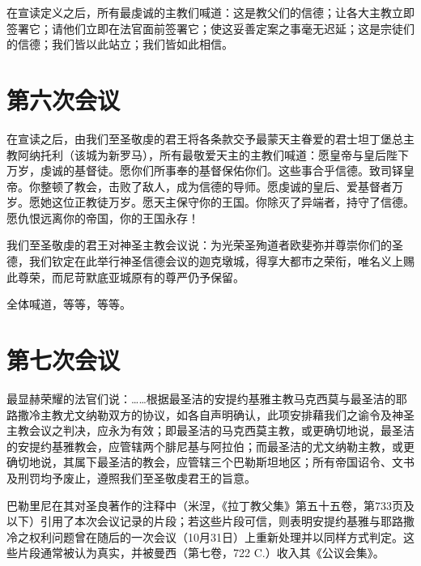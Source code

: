 在宣读定义之后，所有最虔诚的主教们喊道：这是教父们的信德；让各大主教立即签署它；请他们立即在法官面前签署它；使这妥善定案之事毫无迟延；这是宗徒们的信德；我们皆以此站立；我们皆如此相信。\par


\section{第六次会议}

\par

在宣读之后，由我们至圣敬虔的君王将各条款交予最蒙天主眷爱的君士坦丁堡总主教阿纳托利（该城为新罗马），所有最敬爱天主的主教们喊道：愿皇帝与皇后陛下万岁，虔诚的基督徒。愿你们所事奉的基督保佑你们。这些事合乎信德。致司铎皇帝。你整顿了教会，击败了敌人，成为信德的导师。愿虔诚的皇后、爱基督者万岁。愿她这位正教徒万岁。愿天主保守你的王国。你除灭了异端者，持守了信德。愿仇恨远离你的帝国，你的王国永存！\par

我们至圣敬虔的君王对神圣主教会议说：为光荣圣殉道者欧斐弥并尊崇你们的圣德，我们钦定在此举行神圣信德会议的迦克墩城，得享大都市之荣衔，唯名义上赐此尊荣，而尼苛默底亚城原有的尊严仍予保留。\par

全体喊道，等等，等等。\par

\par


\section{第七次会议}

最显赫荣耀的法官们说：……根据最圣洁的安提约基雅主教马克西莫与最圣洁的耶路撒冷主教尤文纳勒双方的协议，如各自声明确认，此项安排藉我们之谕令及神圣主教会议之判决，应永为有效；即最圣洁的马克西莫主教，或更确切地说，最圣洁的安提约基雅教会，应管辖两个腓尼基与阿拉伯；而最圣洁的尤文纳勒主教，或更确切地说，其属下最圣洁的教会，应管辖三个巴勒斯坦地区；所有帝国诏令、文书及刑罚均予废止，遵照我们至圣敬虔君王的旨意。\par

巴勒里尼在其对圣良著作的注释中（米涅，《拉丁教父集》第五十五卷，第733页及以下）引用了本次会议记录的片段；若这些片段可信，则表明安提约基雅与耶路撒冷之权利问题曾在随后的一次会议（10月31日）上重新处理并以同样方式判定。这些片段通常被认为真实，并被曼西（第七卷，722 C.）收入其《公议会集》。\par

